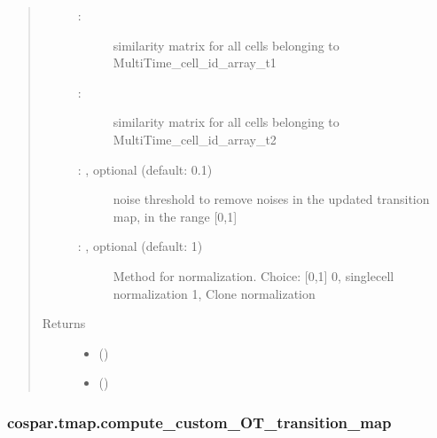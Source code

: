 \documentclass[letterpaper,10pt,english]{sphinxmanual}
\begin{document}
\begin{fulllineitems}
\begin{quote}
\begin{description}
\begin{description}
\item[{ : }] \leavevmode
similarity matrix for all cells belonging
to MultiTime\_cell\_id\_array\_t1

\item[{ : }] \leavevmode
similarity matrix for all cells belonging
to MultiTime\_cell\_id\_array\_t2

\item[{ : , optional (default: 0.1)}] \leavevmode
noise threshold to remove noises in the updated transition map,
in the range {[}0,1{]}

\item[{ : , optional (default: 1)}] \leavevmode
Method for normalization. Choice: {[}0,1{]}
0, single\sphinxhyphen{}cell normalization
1, Clone normalization

\end{description}

\item[{Returns}] \leavevmode
\begin{itemize}
\item {} 
 ()

\item {} 
 ()

\end{itemize}


\end{description}\end{quote}

\end{fulllineitems}



\subsubsection{cospar.tmap.compute\_custom\_OT\_transition\_map}
\label{\detokenize{cospar.tmap.compute_custom_OT_transition_map:cospar-tmap-compute-custom-ot-transition-map}}\label{\detokenize{cospar.tmap.compute_custom_OT_transition_map::doc}}
\end{document}
